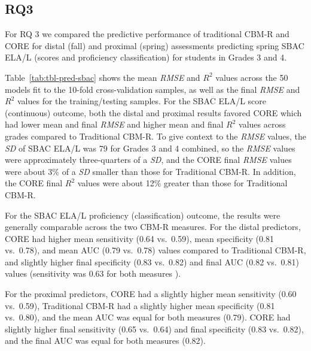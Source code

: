 \documentclass[
  english,
  man, fleqn, noextraspace]{apa6}
\begin{document}
\hypertarget{rq3}{%
\subsection{RQ3}\label{rq3}}

For RQ 3 we compared the predictive performance of traditional CBM-R and CORE for distal (fall) and proximal (spring) assessments predicting spring SBAC ELA/L (scores and proficiency classification) for students in Grades 3 and 4.

Table~\ref{tab:tbl-pred-sbac} shows the mean \emph{RMSE} and \(R^2\) values across the 50 models fit to the 10-fold cross-validation samples, as well as the final \emph{RMSE} and \(R^2\) values for the training/testing samples. For the SBAC ELA/L score (continuous) outcome, both the distal and proximal results favored CORE which had lower mean and final \emph{RMSE} and higher mean and final \(R^2\) values across grades compared to Traditional CBM-R. To give context to the \emph{RMSE} values, the \emph{SD} of SBAC ELA/L was 79 for Grades 3 and 4 combined, so the \emph{RMSE} values were approximately three-quarters of a \emph{SD}, and the CORE final \emph{RMSE} values were about 3\% of a \emph{SD} smaller than those for Traditional CBM-R. In addition, the CORE final \(R^2\) values were about 12\% greater than those for Traditional CBM-R.

For the SBAC ELA/L proficiency (classification) outcome, the results were generally comparable across the two CBM-R measures. For the distal predictors, CORE had higher mean sensitivity (0.64 vs.~0.59), mean specificity (0.81 vs.~0.78), and mean AUC (0.79 vs.~0.78) values compared to Traditional CBM-R, and slightly higher final specificity (0.83 vs.~0.82) and final AUC (0.82 vs.~0.81) values (sensitivity was 0.63 for both measures ).

For the proximal predictors, CORE had a slightly higher mean sensitivity (0.60 vs.~0.59), Traditional CBM-R had a slightly higher mean specificity (0.81 vs.~0.80), and the mean AUC was equal for both measures (0.79). CORE had slightly higher final sensitivity (0.65 vs.~0.64) and final specificity (0.83 vs.~0.82), and the final AUC was equal for both measures (0.82).
\end{document}
